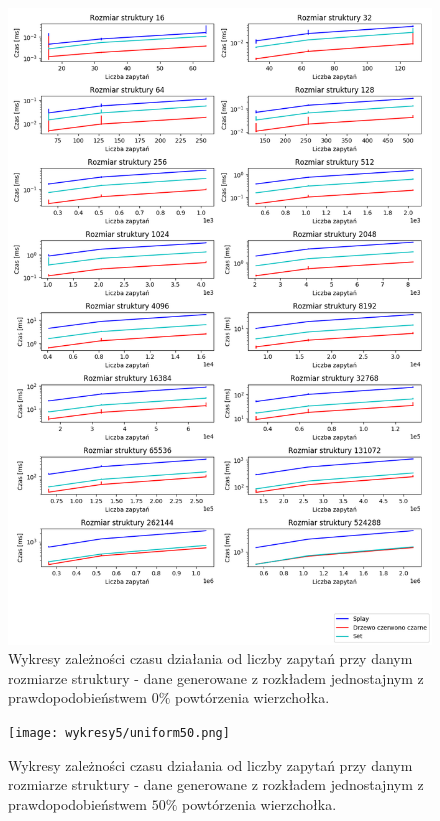 \documentclass[declaration,shortabstract]{iithesis}
\theoremstyle{thm}
\theoremstyle{remark}
\theoremstyle{plain}
\theoremstyle{plain}
\theoremstyle{plain}
\begin{document}
\begin{figure}[H]  
\centering
    \includegraphics[scale=0.45]{wykresy3/uniform100.png}
      \caption{Wykresy zależności czasu działania od liczby zapytań przy danym rozmiarze struktury - dane generowane z rozkładem jednostajnym z prawdopodobieństwem  \(0\%\) powtórzenia wierzchołka. }  
\end{figure}

\begin{figure}[H]  
\centering
    \texttt{[image: wykresy5/uniform50.png]}
      \caption{Wykresy zależności czasu działania od liczby zapytań przy danym rozmiarze struktury - dane generowane z rozkładem jednostajnym z prawdopodobieństwem  \(50\%\) powtórzenia wierzchołka. }  
\end{figure}
\end{document}
